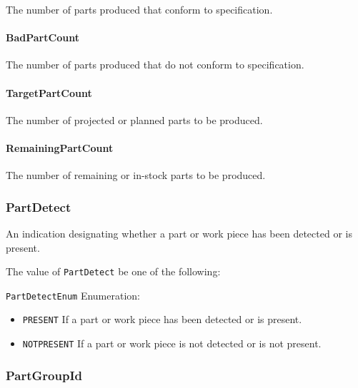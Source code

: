 The number of parts produced that conform to specification.



\paragraph{BadPartCount}\mbox{}
\label{sec:BadPartCount}


The number of parts produced that do not conform to specification.


\paragraph{TargetPartCount}\mbox{}
\label{sec:TargetPartCount}


The number of projected or planned parts to be produced.


\paragraph{RemainingPartCount}\mbox{}
\label{sec:RemainingPartCount}


The number of remaining or in-stock parts to be produced.


\subsubsection{PartDetect}
\label{sec:PartDetect}



An indication designating whether a part or work piece has been detected or is present.



The value of \texttt{PartDetect} \MUST be one of the following: 


\texttt{PartDetectEnum} Enumeration:

\begin{itemize}
\item \texttt{PRESENT} \newline If a part or work piece has been detected or is present. 
\item \texttt{NOT\textunderscore PRESENT} \newline If a part or work piece is not detected or is not present. 
\end{itemize}

\FloatBarrier

\subsubsection{PartGroupId}
\label{sec:PartGroupId}



